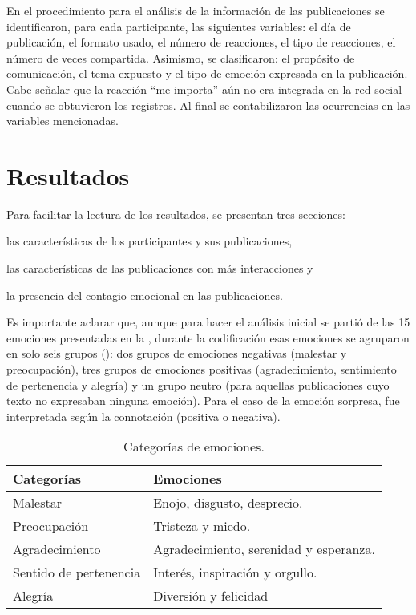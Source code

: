 \documentclass[spanish]{textolivre}
\begin{document}
En el procedimiento para el análisis de la información de las publicaciones se identificaron, para cada participante, las siguientes variables: el día de publicación, el formato usado, el número de reacciones, el tipo de reacciones, el número de veces compartida. Asimismo, se clasificaron: el propósito de comunicación, el tema expuesto y el tipo de emoción expresada en la publicación. Cabe señalar que la reacción “me importa” aún no era integrada en la red social cuando se obtuvieron los registros. Al final se contabilizaron las ocurrencias en las variables mencionadas. 


\section{Resultados}
Para facilitar la lectura de los resultados, se presentan tres secciones: 
\begin{enumerate*}[label=\arabic*)] 
\item las características de los participantes y sus publicaciones,
\item las características de las publicaciones con más interacciones y 
\item la presencia del contagio emocional en las publicaciones. 
\end{enumerate*}

Es importante aclarar que, aunque para hacer el análisis inicial se partió de las 15 emociones presentadas en la , durante la codificación esas emociones se agruparon en solo seis grupos (): dos grupos de emociones negativas (malestar y preocupación), tres grupos de emociones positivas (agradecimiento, sentimiento de pertenencia y alegría) y un grupo neutro (para aquellas publicaciones cuyo texto no expresaban ninguna emoción). Para el caso de la emoción sorpresa, fue interpretada según la connotación (positiva o negativa).

%
%
%
\begin{table}[htpb]
\caption{Categorías de emociones.}
\label{tab02}
\centering
\begin{tabular}{ll}
\toprule 
Categorías & Emociones \\
\midrule 
Malestar & Enojo, disgusto, desprecio. \\
Preocupación & Tristeza y miedo. \\
Agradecimiento & Agradecimiento, serenidad y esperanza. \\
Sentido de pertenencia & Interés, inspiración y orgullo. \\
Alegría & Diversión y felicidad \\
\bottomrule
\end{tabular}
\end{table}
\end{document}
